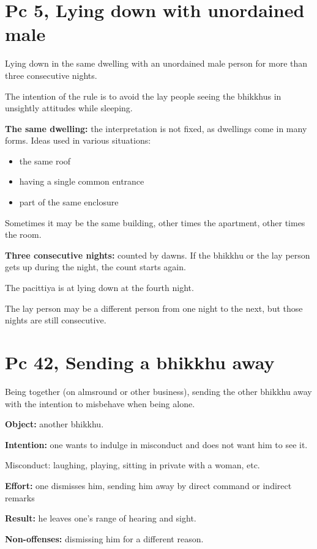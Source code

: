 \section{Pc 5, Lying down with unordained male}

\begin{multicols}{2}

Lying down in the same dwelling with an unordained male person for more
than three consecutive nights.

The intention of the rule is to avoid the lay people seeing the bhikkhus
in unsightly attitudes while sleeping.

\textbf{The same dwelling:} the interpretation is not fixed, as
dwellings come in many forms. Ideas used in various situations:

\begin{itemize}
\tightlist
\item
  the same roof
\item
  having a single common entrance
\item
  part of the same enclosure
\end{itemize}

Sometimes it may be the same building, other times the apartment, other
times the room.

\textbf{Three consecutive nights:} counted by dawns. If the bhikkhu or
the lay person gets up during the night, the count starts again.

The pacittiya is at lying down at the fourth night.

The lay person may be a different person from one night to the next, but
those nights are still consecutive.

\end{multicols}

\section{Pc 42, Sending a bhikkhu away}

\begin{multicols}{2}

Being together (on almsround or other business), sending the other
bhikkhu away with the intention to misbehave when being alone.

\textbf{Object:} another bhikkhu.

\textbf{Intention:} one wants to indulge in misconduct and does not want
him to see it.

Misconduct: laughing, playing, sitting in private with a woman, etc.

\textbf{Effort:} one dismisses him, sending him away by direct command
or indirect remarks

\textbf{Result:} he leaves one's range of hearing and sight.

\textbf{Non-offenses:} dismissing him for a different reason.

\end{multicols}

